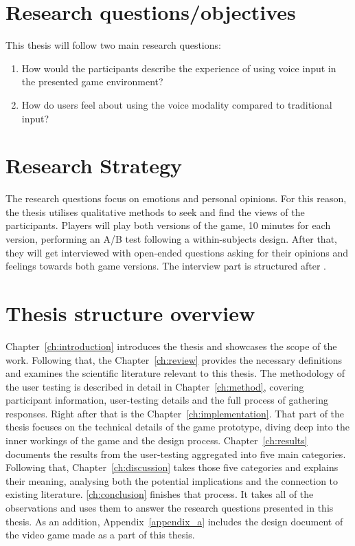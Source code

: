 \section{Research questions/objectives}

This thesis will follow two main research questions:
\begin{enumerate}

    \item How would the participants describe the experience of using voice input in the presented game environment? 
    \item How do users feel about using the voice modality compared to traditional input? 

\end{enumerate}





\section{Research Strategy}



The research questions focus on emotions and personal opinions. For this reason, the thesis utilises qualitative methods to seek and find the views of the participants. 
Players will play both versions of the game, 10 minutes for each version, performing an A/B test following a within-subjects design.
After that, they will get interviewed with open-ended questions asking for their opinions and feelings towards both game versions. The interview part is structured after \textcite{mannResearchInterview2016}.







\section{Thesis structure overview}



Chapter~\ref{ch:introduction} introduces the thesis and showcases the scope of the work. 
Following that, the Chapter~\ref{ch:review} provides the necessary definitions and examines the scientific literature relevant to this thesis.
The methodology of the user testing is described in detail in Chapter~\ref{ch:method}, covering participant information, user-testing details and the full process of gathering responses.
Right after that is the Chapter~\ref{ch:implementation}. That part of the thesis focuses on the technical details of the game prototype, diving deep into the inner workings of the game and the design process. 
Chapter~\ref{ch:results} documents the results from the user-testing aggregated into five main categories.
Following that, Chapter~\ref{ch:discussion} takes those five categories and explains their meaning, analysing both the potential implications and the connection to existing literature.
\ref{ch:conclusion} finishes that process. It takes all of the observations and uses them to answer the research questions presented in this thesis. 
As an addition, Appendix~\ref{appendix_a} includes the design document of the video game made as a part of this thesis.